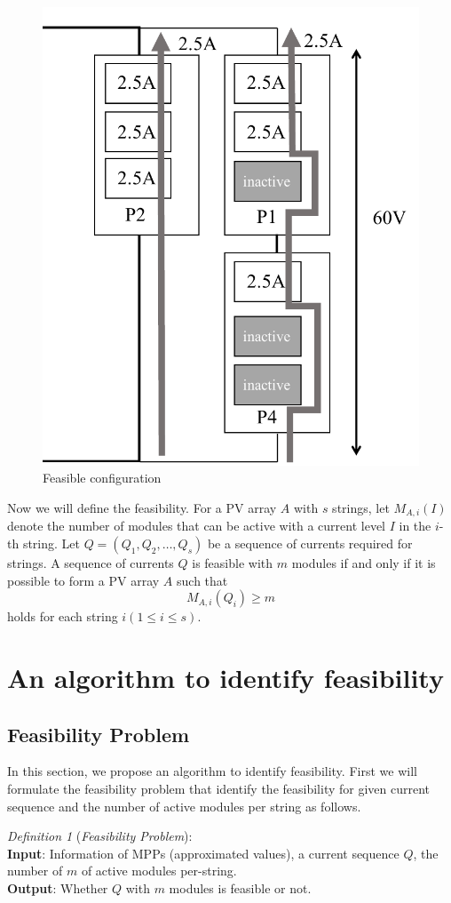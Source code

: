 \documentclass[conference]{pvsctran}
\begin{document}
\begin{figure}[t]
    \centering
    \includegraphics[width=0.6\linewidth]{../fig/feasible-configuration-vertical.pdf}
    \caption{Feasible configuration}
    \label{fig:feasible-configuration}
\end{figure}

Now we will define the feasibility. For a PV array $A$ with $s$ strings, let $M_{A,i}(I)$ denote the number of modules that can be active with a current level $I$ in the $i$-th string.
Let $Q = (Q_{1},Q_{2},\ldots ,Q_{s})$ be a sequence of currents required for strings. 
A sequence of currents $Q$ is feasible with $m$ modules if and only if it is possible to form a PV array $A$ such that 
\begin{equation}
M_{A,i}(Q_{i}) \geq m
\end{equation}
holds for each string $i (1 \leq i \leq s)$.

\section{An algorithm to identify feasibility}\label{Sec5}
\subsection{Feasibility Problem}\label{Sec5_1}
In this section, we propose an algorithm to identify feasibility.
First we will formulate the feasibility problem that identify the feasibility for given current sequence and the number of active modules per string as follows.

\textit{Definition 1} (\textit{Feasibility Problem}):\\
\textbf{Input}: Information of MPPs (approximated values), a current sequence $Q$, the number of $m$ of active modules per-string.\\
\newline
\textbf{Output}: Whether $Q$ with $m$ modules is feasible or not.
\end{document}

